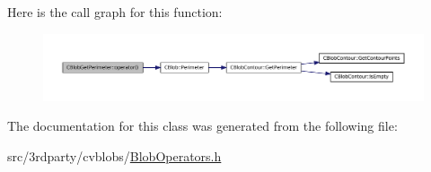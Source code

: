 Here is the call graph for this function:
\nopagebreak
\begin{figure}[H]
\begin{center}
\leavevmode
\includegraphics[width=400pt]{class_c_blob_get_perimeter_a27d6922b9fb5ad220bd0e3876aef7f28_cgraph}
\end{center}
\end{figure}




The documentation for this class was generated from the following file:\begin{DoxyCompactItemize}
\item 
src/3rdparty/cvblobs/\hyperlink{_blob_operators_8h}{BlobOperators.h}\end{DoxyCompactItemize}
